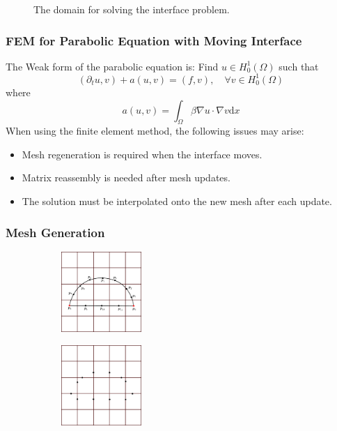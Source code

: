 \documentclass[notheorems,serif]{beamer}
\begin{document}
\begin{CJK}{UTF8}{gkai}
\begin{frame}
\begin{minipage}[b]{0.38\linewidth}
\begin{figure}[htpb]
    \caption{The domain for solving the interface problem.}
\end{figure}
\vspace{25pt}
\end{minipage}

\end{frame}

\begin{frame}
\frametitle{FEM for Parabolic Equation with Moving Interface}
The Weak form of the parabolic equation is: Find $u \in H^1_0(\Omega)$
such that 
$$
(\partial_t u, v) + a(u, v) = (f, v), \quad \forall v \in H^1_0(\Omega)
$$
where 
$$
a(u, v) = \int_{\Omega} \beta \nabla u \cdot \nabla v \mathrm{d}x 
$$
When using the finite element method, the following issues may arise:
\begin{itemize}
    \item Mesh regeneration is required when the interface moves.
    \item Matrix reassembly is needed after mesh updates.
    \item The solution must be interpolated onto the new mesh after each update.
\end{itemize}
\end{frame}

\begin{frame}
    \frametitle{Mesh Generation}
\begin{figure}[htbp]
\begin{subfigure}[t]{0.49\linewidth}
    \centering
    \includegraphics[width=1.2in]{../figures/movingmaxwell/interface_half_cricle.pdf}
\end{subfigure}
\begin{subfigure}[t]{0.49\linewidth}
    \centering
    \includegraphics[width=1.2in]{../figures/movingmaxwell/cut_point.pdf}
\end{subfigure}
\end{figure}


\end{frame}
\end{CJK}
\end{document}
